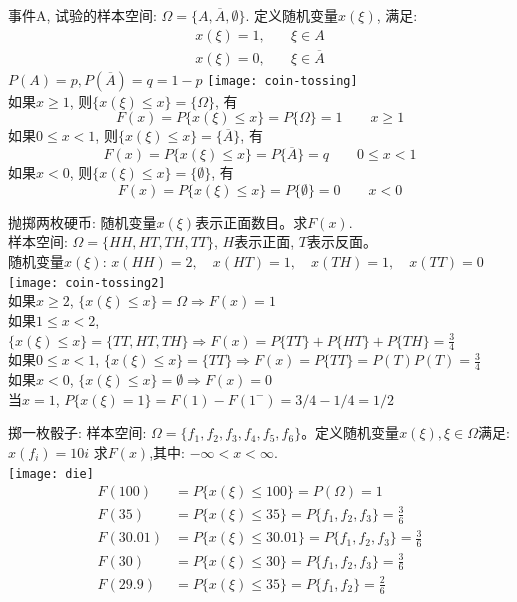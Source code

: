\begin{frame}[shrink]
事件A, 试验的样本空间: $\Omega=\{A,\overline{A},\emptyset \}$. 定义随机变量$x(\xi)$,
满足:
\begin{align*}
	x(\xi)=1, &\quad \xi\in A\\
	x(\xi)=0, &\quad \xi\in\overline{A}
\end{align*}
$P(A)=p,P(\overline{A})=q=1-p$
\texttt{[image: coin-tossing]}\\
如果$x\ge 1$, 则$\{x(\xi)\le x\}=\{\Omega \}$, 有
\[F(x)=P\{x(\xi)\le x \}=P\{\Omega \}=1\qquad x\ge 1 \] 
如果$0\le x<1$, 则$\{x(\xi)\le x\}=\{\overline{A}\}$, 有
\[F(x)=P\{x(\xi)\le x \}=P\{\overline{A}\}=q \qquad 0\le x<1 \] 
如果$x<0$, 则$\{x(\xi)\le x\}=\{\emptyset\}$, 有
\[F(x)=P\{x(\xi)\le x \}=P\{\emptyset\}=0 \qquad x<0 \] 
\end{frame}

\begin{frame}[shrink]
抛掷两枚硬币: 随机变量$x(\xi)$表示正面数目。求$F(x)$.\\
样本空间: $\Omega=\{HH,HT,TH,TT\}$, $H$表示正面, $T$表示反面。\\
随机变量$x(\xi)$: $x(HH)=2,\quad x(HT)=1, \quad x(TH)=1, \quad x(TT)=0$
\texttt{[image: coin-tossing2]}\\
如果$x\ge 2$, $\{x(\xi)\le x\}=\Omega \Rightarrow F(x)=1$ \\
如果$1\le x<2$, $\{x(\xi)\le x\}=\{TT,HT,TH\} \Rightarrow F(x)=P\{TT\}+P\{HT\}+P\{TH\}=\frac{3}{4}$ \\
如果$0\le x<1$, $\{x(\xi)\le x\}=\{TT\} \Rightarrow F(x)=P\{TT\}=P(T)P(T)=\frac{3}{4}$ \\
如果$x<0$, $\{x(\xi)\le x \}=\emptyset \Rightarrow F(x)=0$ \\
当$x=1$, $P\{x(\xi)=1\}=F(1)-F(1^{-})=3/4-1/4=1/2$
\end{frame}

\begin{frame}[shrink]
掷一枚骰子: 样本空间: $\Omega=\{f_1,f_2,f_3,f_4,f_5,f_6\}$。定义随机变量$x(\xi),\xi\in \Omega$满足:$x(f_i)=10i$
求$F(x)$,其中: $-\infty<x<\infty$.\\
\texttt{[image: die]}
\begin{align*}
F(100)&=P\{x(\xi)\le 100 \}=P(\Omega)=1\\
F(35)&=P\{x(\xi)\le 35 \}=P\{f_1,f_2,f_3 \}=\frac{3}{6} \\
F(30.01)&=P\{x(\xi)\le 30.01 \}=P\{f_1,f_2,f_3 \}=\frac{3}{6} \\
F(30)&=P\{x(\xi)\le 30 \}=P\{f_1,f_2,f_3 \}=\frac{3}{6} \\
F(29.9)&=P\{x(\xi)\le 35 \}=P\{f_1,f_2 \}=\frac{2}{6} \\
\end{align*}
\end{frame}

